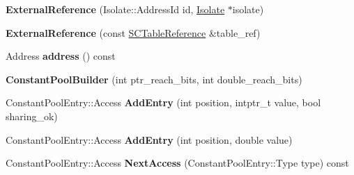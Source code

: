 \begin{DoxyCompactItemize}
\item 
{\bfseries External\+Reference} (Isolate\+::\+Address\+Id id, \hyperlink{classv8_1_1internal_1_1_isolate}{Isolate} $\ast$isolate)\hypertarget{classv8_1_1internal_1_1_b_a_s_e___e_m_b_e_d_d_e_d_a3dd8e7e14774b55861b7f999a206978b}{}\label{classv8_1_1internal_1_1_b_a_s_e___e_m_b_e_d_d_e_d_a3dd8e7e14774b55861b7f999a206978b}

\item 
{\bfseries External\+Reference} (const \hyperlink{classv8_1_1internal_1_1_s_c_table_reference}{S\+C\+Table\+Reference} \&table\+\_\+ref)\hypertarget{classv8_1_1internal_1_1_b_a_s_e___e_m_b_e_d_d_e_d_a258ab641d429e00633880a2e3559cfb2}{}\label{classv8_1_1internal_1_1_b_a_s_e___e_m_b_e_d_d_e_d_a258ab641d429e00633880a2e3559cfb2}

\item 
Address {\bfseries address} () const \hypertarget{classv8_1_1internal_1_1_b_a_s_e___e_m_b_e_d_d_e_d_a51a0ede6e14d53b7ac296a0ee52b48c0}{}\label{classv8_1_1internal_1_1_b_a_s_e___e_m_b_e_d_d_e_d_a51a0ede6e14d53b7ac296a0ee52b48c0}

\item 
{\bfseries Constant\+Pool\+Builder} (int ptr\+\_\+reach\+\_\+bits, int double\+\_\+reach\+\_\+bits)\hypertarget{classv8_1_1internal_1_1_b_a_s_e___e_m_b_e_d_d_e_d_a88a647739dfaf455c333a78b382b57d1}{}\label{classv8_1_1internal_1_1_b_a_s_e___e_m_b_e_d_d_e_d_a88a647739dfaf455c333a78b382b57d1}

\item 
Constant\+Pool\+Entry\+::\+Access {\bfseries Add\+Entry} (int position, intptr\+\_\+t value, bool sharing\+\_\+ok)\hypertarget{classv8_1_1internal_1_1_b_a_s_e___e_m_b_e_d_d_e_d_a5ab5d5513e76a422cd1bea62fad9e0a0}{}\label{classv8_1_1internal_1_1_b_a_s_e___e_m_b_e_d_d_e_d_a5ab5d5513e76a422cd1bea62fad9e0a0}

\item 
Constant\+Pool\+Entry\+::\+Access {\bfseries Add\+Entry} (int position, double value)\hypertarget{classv8_1_1internal_1_1_b_a_s_e___e_m_b_e_d_d_e_d_ad51808ec40d0ef57fee51269c854f97c}{}\label{classv8_1_1internal_1_1_b_a_s_e___e_m_b_e_d_d_e_d_ad51808ec40d0ef57fee51269c854f97c}

\item 
Constant\+Pool\+Entry\+::\+Access {\bfseries Next\+Access} (Constant\+Pool\+Entry\+::\+Type type) const \hypertarget{classv8_1_1internal_1_1_b_a_s_e___e_m_b_e_d_d_e_d_a1db580176b8e8f5b024fbe3a3cb45b35}{}\label{classv8_1_1internal_1_1_b_a_s_e___e_m_b_e_d_d_e_d_a1db580176b8e8f5b024fbe3a3cb45b35}


\end{DoxyCompactItemize}
